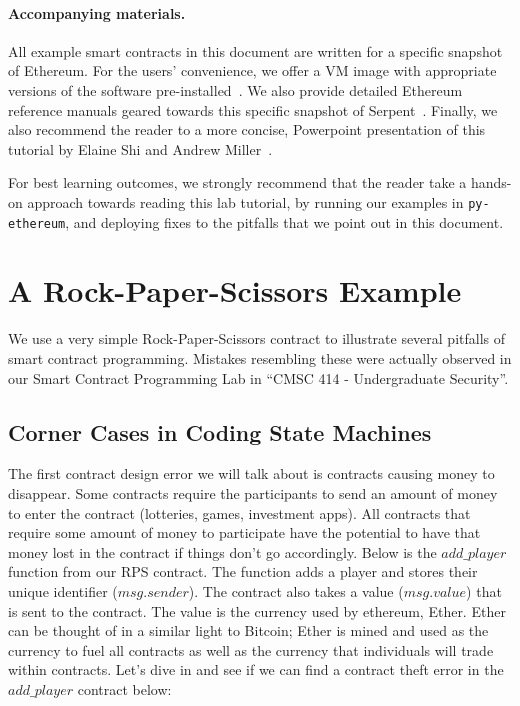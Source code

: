 \documentclass[12pt]{article}
\begin{document}
\paragraph{Accompanying materials.}
All example smart contracts 
in this document are written for a specific 
snapshot of Ethereum.  
For the users' convenience, we offer
a VM image with appropriate  
versions of the software pre-installed~\cite{vmimage}.
We also provide detailed Ethereum reference manuals
geared towards this specific 
snapshot of Serpent~\cite{serpentref}.
Finally, we also recommend the reader
to a more concise, Powerpoint presentation of this tutorial
by Elaine Shi and Andrew Miller~\cite{Shi2015}.


For best learning outcomes, 
we strongly recommend that the reader take a hands-on approach
towards reading this lab tutorial, by running
our examples in {\tt py-ethereum}, and 
deploying fixes to the 
pitfalls that we point out in this document.



\section{A Rock-Paper-Scissors Example}
We use a very simple Rock-Paper-Scissors contract to illustrate
several pitfalls of smart contract programming.
Mistakes resembling these 
were actually observed in our Smart Contract Programming Lab  
in ``CMSC 414 - Undergraduate Security''.


\subsection{Corner Cases in Coding State Machines}
The first contract design error we will talk about is contracts causing money to disappear. Some contracts require the participants to send an amount of money to enter the contract (lotteries, games, investment apps). All contracts that require some amount of money to participate have the potential to have that money lost in the contract if things don't go accordingly. Below is the $add\_player$ function from our RPS contract. The function adds a player and stores their unique identifier ($msg.sender$). The contract also takes a value ($msg.value$) that is sent to the contract. The value is the currency used by ethereum, Ether. Ether can be thought of in a similar light to Bitcoin; Ether is mined and used as the currency to fuel all contracts as well as the currency that individuals will trade within contracts. Let's dive in and see if we can find a contract theft error in the $add\_player$ contract below: 
\end{document}
